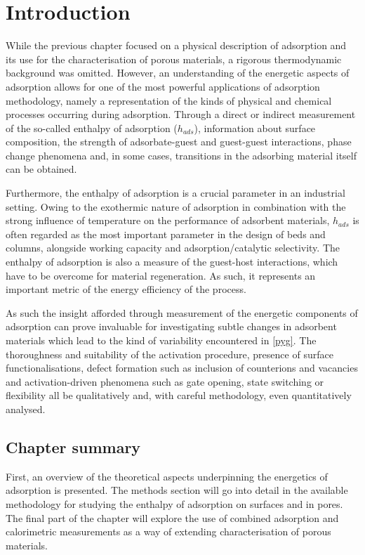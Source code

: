 
\section{Introduction}

While the previous chapter focused on a physical description
of adsorption and its use for the characterisation of
porous materials, a rigorous thermodynamic background
was omitted. However, an understanding of the energetic
aspects of adsorption allows for one of the most powerful
applications of adsorption methodology, namely a representation
of the kinds of physical and chemical processes occurring
during adsorption. Through a direct or indirect measurement
of the so-called enthalpy of adsorption (\(h_{ads}\)),
information about surface composition, the strength of
adsorbate-guest and guest-guest interactions, phase change
phenomena and, in some cases, transitions in the
adsorbing material itself can be obtained.

Furthermore, the enthalpy of adsorption is a crucial parameter
in an industrial setting. Owing to the exothermic nature of
adsorption in combination with the strong influence of temperature
on the performance of adsorbent materials, \(h_{ads}\) is
often regarded as the most important parameter in the
design of beds and columns, alongside working capacity and
adsorption/catalytic selectivity. The enthalpy of adsorption
is also a measure of the guest-host interactions, which
have to be overcome for material regeneration. As such, it
represents an important metric of the energy efficiency
of the process.

As such the insight afforded through measurement of
the energetic components of adsorption can prove invaluable
for investigating subtle changes in adsorbent materials
which lead to the kind of variability encountered in
\autoref{pyg}. The thoroughness and suitability of the activation
procedure, presence of surface functionalisations, defect
formation such as inclusion of counterions and vacancies
and activation-driven phenomena such as gate opening,
state switching or flexibility all be qualitatively and,
with careful methodology, even quantitatively analysed.

\subsection*{Chapter summary}

First, an overview of the theoretical aspects underpinning
the energetics of adsorption is presented. The methods
section will go into detail in the available methodology
for studying the enthalpy of adsorption on surfaces and in
pores. The final part of the chapter will explore the use
of combined adsorption and calorimetric measurements
as a way of extending characterisation of porous materials.

